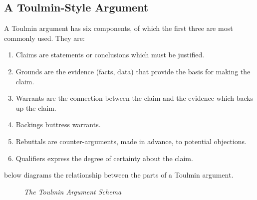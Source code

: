 \subsection{A Toulmin-Style Argument}\label{sec:toulmin-arguments}\indent

A Toulmin argument has six components, of which the first three are most commonly used. They are:

\begin{enumerate}
  \item Claims are statements or conclusions which must be justified.
  \item Grounds are the evidence (facts, data) that provide the basis for making the claim.
  \item Warrants are the connection between the claim and the evidence which backs up the claim.
  \item Backings buttress warrants.
  \item Rebuttals are counter-arguments, made in advance, to potential objections.
  \item Qualifiers express the degree of certainty about the claim.
\end{enumerate}

 below diagrams the relationship between the parts of a Toulmin argument.

\begin{figure}[htbp]
  \caption{\textit{The Toulmin Argument Schema}}\label{fig:toulmin-arg}%
  \centering%
\end{figure}

